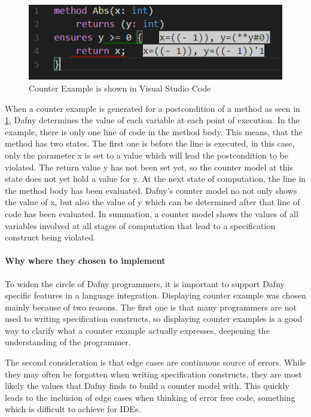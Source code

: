 \begin{figure}[H]
	\centering
	\includegraphics[width=1\textwidth]{img/counterModel}
	\caption{Counter Example is shown in Visual Studio Code}
	\label{fig:dfcounterModel}
\end{figure}

When a counter example is generated for a postcondition of a method as seen in \ref{fig:dfcounterModel}, Dafny determines the value of each variable at each point of execution. In the example, there is only one line of code in the method body. This means, that the method has two states. The first one is before the line is executed, in this case, only the parameter x is set to a value which will lead the postcondition to be violated. The return value y has not been set yet, so the counter model at this state does not yet hold a value for y. \newline
At the next state of computation, the line in the method body has been evaluated. Dafny's counter model no not only shows the value of x, but also the value of y which can be determined after that line of code has been evaluated. \newline
In summation, a counter model shows the values of all variables involved at all stages of computation that lead to a specification construct being violated. 

\paragraph{Why where they chosen to implement}
To widen the circle of Dafny programmers, it is important to support Dafny specific features in a language integration. Displaying counter example was chosen mainly because of two reasons. The first one is that many programmers are not used to writing specification constructs, so displaying counter examples is a good way to clarify what a counter example actually expresses, deepening the understanding of the programmer. \newline

The second consideration is that edge cases are continuous source of errors. While they may often be forgotten when writing specification constructs, they are most likely the values that Dafny finds to build a counter model with. This quickly leads to the inclusion of edge cases when thinking of error free code, something which is difficult to achieve for IDEs. \newline

